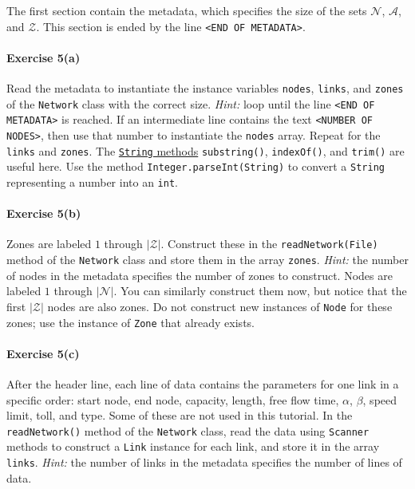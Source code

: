 \documentclass[12pt]{article}
\newcommand{\N}{\mathcal{N}}
\newcommand{\A}{\mathcal{A}}
\newcommand{\Z}{\mathcal{Z}}
\begin{document}
\noindent The first section contain the metadata, which specifies the size of the sets $\N$, $\A$, and $\Z$. This section is ended by the line \texttt{<END OF METADATA>}. 




\paragraph*{Exercise 5(a)} Read the metadata to instantiate the instance variables \texttt{nodes}, \texttt{links}, and \texttt{zones} of the \texttt{Network} class with the correct size. \textit{Hint:} loop until the line \texttt{<END OF METADATA>} is reached. If an intermediate line contains the text \texttt{<NUMBER OF NODES>}, then use that number to instantiate the \texttt{nodes} array. Repeat for the \texttt{links} and \texttt{zones}. The \href{https://www.w3schools.com/java/java_ref_string.asp}{\texttt{String} methods} \texttt{substring()}, \texttt{indexOf()}, and \texttt{trim()} are useful here. Use the method \texttt{Integer.parseInt(String)} to convert a \texttt{String} representing a number into an \texttt{int}. 

\vspace{\baselineskip}

\paragraph*{Exercise 5(b)} \noindent Zones are labeled $1$ through $\vert \Z \vert$. Construct these in the  \texttt{readNetwork(File)} method of the \texttt{Network} class and store them in the array \texttt{zones}. \textit{Hint:} the number of nodes in the metadata specifies the number of zones to construct.
Nodes are labeled $1$ through $\vert \N \vert$. You can similarly construct them now, but notice that the first $\vert \Z \vert$ nodes are also zones. Do not construct new instances of \texttt{Node} for these zones; use the instance of \texttt{Zone} that already exists. 

\paragraph*{Exercise 5(c)} After the header line, each line of data contains the parameters for one link in a specific order: start node, end node, capacity, length, free flow time, $\alpha$, $\beta$, speed limit, toll, and type. Some of these are not used in this tutorial. In the \texttt{readNetwork()} method of the \texttt{Network} class, read the data using \texttt{Scanner} methods to construct a \texttt{Link} instance for each link, and store it in the array \texttt{links}. \textit{Hint:} the number of links in the metadata specifies the number of lines of data. 
\end{document}
